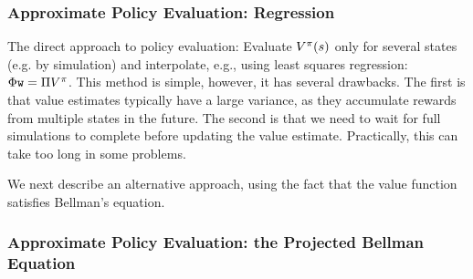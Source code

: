\subsubsection{Approximate Policy Evaluation: Regression}

The direct approach to policy evaluation: Evaluate $V^\pi(s)$ only for several states (e.g. by simulation) and interpolate, e.g., using least squares regression: $\Phi \texttt{w} = \Pi V^\pi$. This method is simple, however, it has several drawbacks. The first is that value estimates typically have a large variance, as they accumulate rewards from multiple states in the future. The second is that we need to wait for full simulations to complete before updating the value estimate. Practically, this can take too long in some problems. 

We next describe an alternative approach, using the fact that the value function satisfies Bellman's equation.

\subsubsection{Approximate Policy Evaluation: the Projected Bellman Equation}


